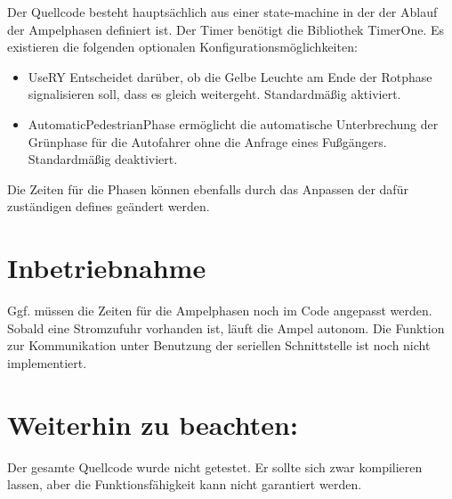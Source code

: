 \documentclass[halfparskip]{scrartcl}
\begin{document}


Der Quellcode besteht hauptsächlich aus einer state-machine in der der Ablauf der Ampelphasen definiert ist.
Der Timer benötigt die Bibliothek TimerOne.
Es existieren die folgenden optionalen Konfigurationsmöglichkeiten:

\begin{itemize}
    \item UseRY Entscheidet darüber, ob die Gelbe Leuchte am Ende der Rotphase signalisieren soll, dass es gleich weitergeht. Standardmäßig aktiviert.
    \item AutomaticPedestrianPhase ermöglicht die automatische Unterbrechung der Grünphase für die Autofahrer ohne die Anfrage eines Fußgängers. Standardmäßig deaktiviert.
\end{itemize}

Die Zeiten für die Phasen können ebenfalls durch das Anpassen der dafür zuständigen defines geändert werden.

\section{Inbetriebnahme}
\label{sec:inbetriebnahme}
Ggf. müssen die Zeiten für die Ampelphasen noch im Code angepasst werden.
Sobald eine Stromzufuhr vorhanden ist, läuft die Ampel autonom. Die Funktion zur Kommunikation unter Benutzung der seriellen Schnittstelle ist noch nicht implementiert.

\section{Weiterhin zu beachten:}
\label{sec:weiterhin}
Der gesamte Quellcode wurde nicht getestet. Er sollte sich zwar kompilieren lassen, aber die Funktionsfähigkeit kann nicht garantiert werden.
\end{document}
